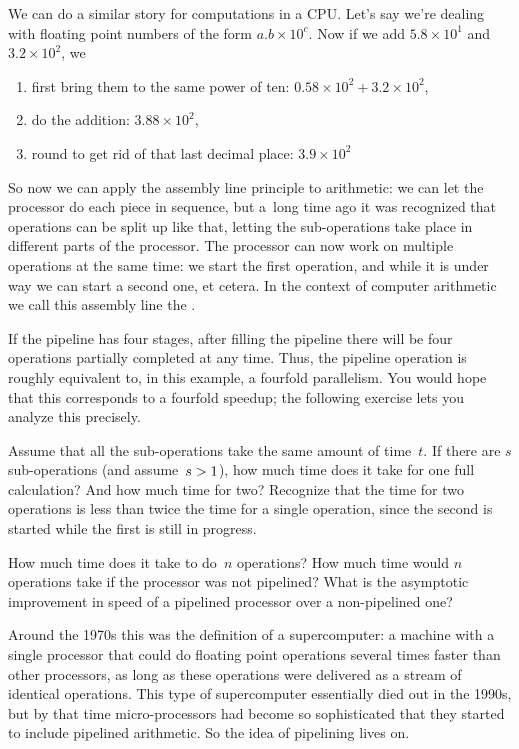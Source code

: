 We can do a similar story for computations in a CPU. Let's say we're
dealing with floating point numbers of the form $a.b\times 10^c$.  Now
if we add $5.8\times 10^1$ and $3.2\times 10^2$, we
\begin{enumerate}
\item first bring them to the same power of ten: $0.58\times
  10^2+3.2\times 10^2$,
\item do the addition: $3.88\times 10^2$,
\item round to get rid of that last decimal place: $3.9\times 10^2$
\end{enumerate}
So now we can apply the assembly line principle to arithmetic: 
we can let the processor do each piece in sequence, but
a~long time ago it was recognized that operations can be split up like that,
letting the sub-operations take place in different parts of the processor.
%
The processor can now work on multiple operations at the same time: we
start the first operation, and while it is under way we can start a
second one, et cetera.  In the context of computer arithmetic we call
this assembly line the .

If the pipeline has four stages, after filling the pipeline there will
be four operations partially completed at any time. Thus, the pipeline
operation is roughly equivalent to, in this example, a fourfold
parallelism. You would hope that this corresponds to a fourfold speedup; 
the following exercise lets you analyze this precisely.
\begin{exercise}
  Assume that all the sub-operations take the same amount of
  time~$t$. If there are $s$ sub-operations (and
  assume~$s>\nobreak1$), how much time does it take for one full
  calculation? And how much time for two? Recognize that the time
  for two operations is less than twice the time for a single operation,
  since the second is started while the first is still in progress.

  How much time does it take to do~$n$ operations? How much
  time would $n$ operations take if the processor was not pipelined?
  What is the asymptotic improvement in speed of a pipelined processor
  over a non-pipelined one?
\end{exercise}

Around the 1970s this was the definition of a supercomputer: a machine
with a single processor that could do floating point operations
several times faster than other processors, as long as these
operations were delivered as a stream of identical operations. This
type of supercomputer essentially died out in the 1990s, but by that
time micro-processors had become so sophisticated that they started to
include pipelined arithmetic. So the idea of pipelining lives on.

